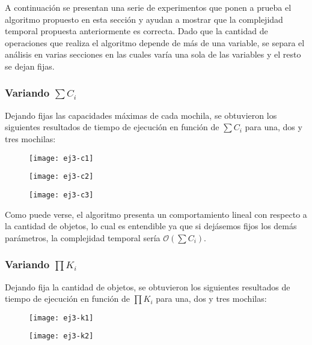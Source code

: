 A continuación se presentan una serie de experimentos que ponen a prueba el algoritmo propuesto en esta sección y ayudan a mostrar que la complejidad temporal propuesta anteriormente es correcta.
Dado que la cantidad de operaciones que realiza el algoritmo depende de más de una variable, se separa el análisis en varias secciones en las cuales varía una sola de las variables y el resto se dejan fijas.

\subsubsection{Variando $\sum C_i$}

Dejando fijas las capacidades máximas de cada mochila, se obtuvieron los siguientes resultados de tiempo de ejecución en función de $\sum C_i$ para una, dos y tres mochilas:

\begin{figure}[H]
		\centering
		\texttt{[image: ej3-c1]}
	\end{figure}

\begin{figure}[H]
		\centering
		\texttt{[image: ej3-c2]}
	\end{figure}

\begin{figure}[H]
		\centering
		\texttt{[image: ej3-c3]}
	\end{figure}

Como puede verse, el algoritmo presenta un comportamiento lineal con respecto a la cantidad de objetos, lo cual es entendible ya que si dejásemos fijos los demás parámetros, la complejidad temporal sería $\mathcal{O}(\sum C_i)$. %

\subsubsection{Variando $\prod K_i$}

Dejando fija la cantidad de objetos, se obtuvieron los siguientes resultados de tiempo de ejecución en función de $\prod K_i$ para una, dos y tres mochilas:

\begin{figure}[H]
		\centering
		\texttt{[image: ej3-k1]}
	\end{figure}

\begin{figure}[H]
		\centering
		\texttt{[image: ej3-k2]}
	\end{figure}

